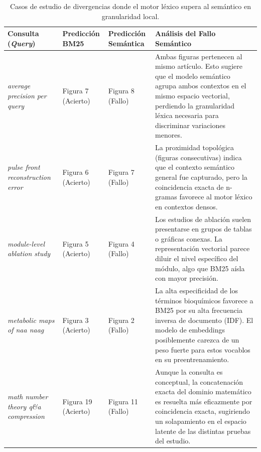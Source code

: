 \documentclass[a4paper]{report}
\renewcommand{\arraystretch}{1.5}
\begin{document}
\begin{table}[htpb]
    \centering
    \renewcommand{\arraystretch}{1.3} 
    \begin{tabular}{|p{3.5cm}|p{2.5cm}|p{2.5cm}|p{6cm}|}
    \hline
    \textbf{Consulta (\textit{Query})} & \textbf{Predicción BM25} & \textbf{Predicción Semántica} & \textbf{Análisis del Fallo Semántico} \\
    \hline
    \textit{average precision per query} & Figura 7 (Acierto) & Figura 8 (Fallo) & Ambas figuras pertenecen al mismo artículo. Esto sugiere que el modelo semántico agrupa ambos contextos en el mismo espacio vectorial, perdiendo la granularidad léxica necesaria para discriminar variaciones menores. \\
    \hline
    \textit{pulse front reconstruction error} & Figura 6 (Acierto) & Figura 7 (Fallo) & La proximidad topológica (figuras consecutivas) indica que el contexto semántico general fue capturado, pero la coincidencia exacta de n-gramas favorece al motor léxico en contextos densos. \\
    \hline
    \textit{module-level ablation study} & Figura 5 (Acierto) & Figura 4 (Fallo) & Los estudios de ablación suelen presentarse en grupos de tablas o gráficas conexas. La representación vectorial parece diluir el nivel específico del módulo, algo que BM25 aísla con mayor precisión. \\
    \hline
    \textit{metabolic maps of naa naag} & Figura 3 (Acierto) & Figura 2 (Fallo) & La alta especificidad de los términos bioquímicos favorece a BM25 por su alta frecuencia inversa de documento (IDF). El modelo de embeddings posiblemente carezca de un peso fuerte para estos vocablos en su preentrenamiento. \\
    \hline
    \textit{math number theory q\&a compression} & Figura 19 (Acierto) & Figura 11 (Fallo) & Aunque la consulta es conceptual, la concatenación exacta del dominio matemático es resuelta más eficazmente por coincidencia exacta, sugiriendo un solapamiento en el espacio latente de las distintas pruebas del estudio. \\
    \hline
    \end{tabular}
    \caption{Casos de estudio de divergencias donde el motor léxico supera al semántico en granularidad local.}
    \label{tab:divergencias_semantico}
\end{table}
\end{document}

